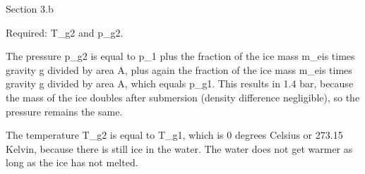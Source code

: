 Section 3.b

Required: T_g2 and p_g2.

The pressure p_g2 is equal to p_1 plus the fraction of the ice mass m_eis times gravity g divided by area A, plus again the fraction of the ice mass m_eis times gravity g divided by area A, which equals p_g1. This results in 1.4 bar, because the mass of the ice doubles after submersion (density difference negligible), so the pressure remains the same.

The temperature T_g2 is equal to T_g1, which is 0 degrees Celsius or 273.15 Kelvin, because there is still ice in the water. The water does not get warmer as long as the ice has not melted.